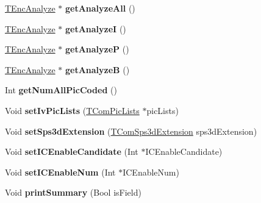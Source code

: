 \begin{DoxyCompactItemize}
\item 
\mbox{\label{class_t_enc_top_a20c742217f4f86b7199a814bcd364882}} 
\hyperlink{class_t_enc_analyze}{T\+Enc\+Analyze} $\ast$ {\bfseries get\+Analyze\+All} ()
\item 
\mbox{\label{class_t_enc_top_a9fec5d15744d1630cb77d5738c9eb886}} 
\hyperlink{class_t_enc_analyze}{T\+Enc\+Analyze} $\ast$ {\bfseries get\+AnalyzeI} ()
\item 
\mbox{\label{class_t_enc_top_a039c29d8bfd0155361888ab92ad0ef18}} 
\hyperlink{class_t_enc_analyze}{T\+Enc\+Analyze} $\ast$ {\bfseries get\+AnalyzeP} ()
\item 
\mbox{\label{class_t_enc_top_a594fef824f2ea7d53a2a2d56e2c16f9f}} 
\hyperlink{class_t_enc_analyze}{T\+Enc\+Analyze} $\ast$ {\bfseries get\+AnalyzeB} ()
\item 
\mbox{\label{class_t_enc_top_ae98c68b7462917859ddcc82701a2d26f}} 
Int {\bfseries get\+Num\+All\+Pic\+Coded} ()
\item 
\mbox{\label{class_t_enc_top_ad250ec2f4890927e2f151662e8cac878}} 
Void {\bfseries set\+Iv\+Pic\+Lists} (\hyperlink{class_t_com_pic_lists}{T\+Com\+Pic\+Lists} $\ast$pic\+Lists)
\item 
\mbox{\label{class_t_enc_top_ad59ed68b7f26de4d25e8c1eb55fdbd93}} 
Void {\bfseries set\+Sps3d\+Extension} (\hyperlink{class_t_com_sps3d_extension}{T\+Com\+Sps3d\+Extension} sps3d\+Extension)
\item 
\mbox{\label{class_t_enc_top_acc3eb58e918b9c08bec9014d20eea63f}} 
Void {\bfseries set\+I\+C\+Enable\+Candidate} (Int $\ast$I\+C\+Enable\+Candidate)
\item 
\mbox{\label{class_t_enc_top_ab79786001c9256f7dc286b68cefba838}} 
Void {\bfseries set\+I\+C\+Enable\+Num} (Int $\ast$I\+C\+Enable\+Num)
\item 
\mbox{\label{class_t_enc_top_afb8fced114b63b4bca472f9f114d4c62}} 
Void {\bfseries print\+Summary} (Bool is\+Field)
\end{DoxyCompactItemize}
